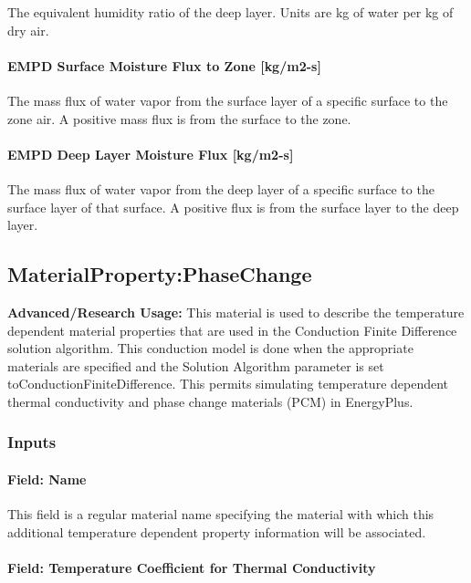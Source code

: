 The equivalent humidity ratio of the deep layer. Units are kg of water
per kg of dry air.

\paragraph{EMPD Surface Moisture Flux to Zone
	{[}kg/m2-s{]}}\label{empd-surface-moisture-flux-to-zone-kgm2-s}

The mass flux of water vapor from the surface layer of a specific
surface to the zone air. A positive mass flux is from the surface to the
zone.

\paragraph{EMPD Deep Layer Moisture Flux
	{[}kg/m2-s{]}}\label{empd-deep-layer-moisture-flux-kgm2-s}

The mass flux of water vapor from the deep layer of a specific surface
to the surface layer of that surface. A positive flux is from the
surface layer to the deep layer.

\subsection{MaterialProperty:PhaseChange}\label{materialpropertyphasechange}

\textbf{Advanced/Research Usage:} This material is used to describe the temperature dependent material properties that are used in the Conduction Finite Difference solution algorithm. This conduction model is done when the appropriate materials are specified and the Solution Algorithm parameter is set toConductionFiniteDifference. This permits simulating temperature dependent thermal conductivity and phase change materials (PCM) in EnergyPlus.

\subsubsection{Inputs}\label{inputs-5-030}

\paragraph{Field: Name}\label{field-name-5-024}

This field is a regular material name specifying the material with which this additional temperature dependent property information will be associated.

\paragraph{Field: Temperature Coefficient for Thermal Conductivity}\label{field-temperature-coefficient-for-thermal-conductivity}

